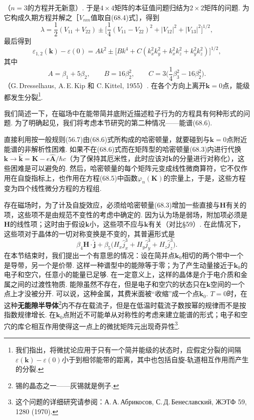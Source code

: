 （$n=3$的方程并无新意）. 于是$4\times4$矩阵的本征值问题归结为$2\times2$矩阵的问题. 为它构成久期方程并解之［$V_{nm}$值取自(68.4)式］，得到
\begin{equation*}
\lambda=\frac{1}{2}(V_{11}+V_{22})\pm
\biggl[\frac{1}{4}(V_{11}-V_{22})^2+|V_{12}|^2+|V_{13}|^2\biggr]^{1/2},
\end{equation*}
最后得到
\begin{equation}
\varepsilon_{1,2}(\bm{k})-\varepsilon(0)=Ak^2\pm
\bigl[Bk^4+C(k^2_xk^2_y+k^2_xk^2_z+k^2_yk^2_z)\bigr]^{1/2},
\end{equation}
其中
\begin{equation*}
A=\beta_1+5\beta_2,\qquad B=16\beta^2_2,\qquad
C=3\biggl(\frac{1}{4}\beta^2_3-16\beta^2_2\biggr).
\end{equation*}
（G.\,Dresselhaus, A.\,E.\,Kip 和 C.\,Kittel, 1955）. 在各个方向上离开$\bm{k}=0$点，能级都发生分裂\footnote{我们指出，将微扰论应用于只有一个简并能级的状态时，应假定分裂的间隔$\varepsilon(\bm k)-\varepsilon(0)$小于到相邻能带的距离，其中也包括自旋-轨道相互作用而产生的分裂.}.

我们简述一下，在磁场中在能带简并底附近描述粒子行为的方程具有何种形式的问题. 为了明确起见，我们将考虑本节研究的第二种情况——能谱(68.6).

直接利用按一般规则(56.7)由(68.6)式所构成的哈密顿量，就要碰到与$\bm{k}=0$点附近能谱的非解析性困难. 如果不在(68.6)式而在矩阵型的哈密顿量(68.3)内进行代换
$\bm{k}\to\hat{\bm{k}}=\bm{K}-e\hat{\bm{A}}/\hbar c$（为了保持其厄米性，此时应该对$\bm{k}$的分量进行对称化），这些困难是可以避免的. 然后，哈密顿量的每个矩阵元变成线性微商算符，它不仅作用在自旋指标上，也作用在方程(68.5)中函数$\varphi_n(\bm{K})$的宗量上，于是，这些方程变为四个线性微分方程的方程组.

存在磁场时，为了计及自旋效应，必须给哈密顿量(68.3)增加一些直接与$\bm{H}$有关的项，这些项不是由规范不变性的考虑中确定的. 因为认为场是弱场，附加项必须是$\bm{H}$的线性项；这时由于假设$\bm{k}$小，这些项不应与$\bm{k}$有关（对比§59）. 在此情况下，这些项对于晶体的一切对称变换是不变的，其普遍形式是
\begin{equation}
\beta_4\bm{H}\cdot\hat{\bm{j}}
+\beta_5\bigl(H_x\hat{j}^3_x+H_y\hat{j}^3_y+H_z\hat{j}^3_z\bigr).
\end{equation}
在本节结束时，我们提出一个有意思的情况：设在简并点$\bm{k}_0$相切的两个带中一个是导带，另一个是价带. 这样一种谱型中的能隙等于零；为了产生动量接近于$\bm{k}_0$的电子和空穴，任意小的能量已足够. 在一定意义上，这样的晶体是介于电介质和金属之间的过渡性物质. 能隙虽然不存在，但是电子和空穴的状态只在$\bm{k}$空间的一个点上才没被分开. 可以说，这种金属，其费米面被“收缩”成一个点$\bm{k}_0$. $T=0$时，在这种\textbf{无能隙半导体}\footnote{锡的晶态之一——灰锡就是例子.}内不存在载流子，但是在低温时载流子数按幂的规律而不是按指数规律增长. 在$\bm{k}_0$点附近不可能单从对称性的考虑来建立能谱的形式；电子和空穴的库仑相互作用使得这一点上的微扰矩阵元出现奇异性\footnote{这个问题的详细研究请参阅：А.\,А.\,Абрикосов, С.\,Д.\,Бенеславский, ЖЭТФ 59, 1280 (1970).}.
